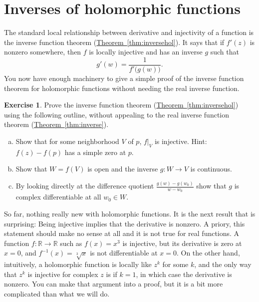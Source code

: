 \documentclass[12pt,openany]{book}
\newcommand{\R}{{\mathbb{R}}}
\theoremstyle{plain}
\theoremstyle{remark}
\theoremstyle{definition}
\newenvironment{exbox}{%
    \def\FrameCommand{\vrule width 1pt \relax\hspace{10pt}}%
    \MakeFramed{\advance\hsize-\width\FrameRestore}%
}{%
    \endMakeFramed
}
\newenvironment{exparts}{%
    \leavevmode\begin{enumerate}[a),noitemsep,topsep=0pt,parsep=0pt,partopsep=0pt]
}{%
    \end{enumerate}
}
\theoremstyle{exercise}
\newtheorem{exercise}{Exercise}[section]
\theoremstyle{example}
\newcommand{\thmref}[1]{\hyperref[#1]{Theorem~\ref*{#1}}}
\begin{document}
\section{Inverses of holomorphic functions} \label{sec:inverses}

The standard local relationship between derivative and injectivity of a
function is the inverse function theorem (\thmref{thm:inversehol}).
It says that if $f'(z)$ is nonzero somewhere, then $f$ is locally
injective and has an inverse $g$ such that
\begin{equation*}
g'(w) = \frac{1}{f'\bigl(g(w)\bigr)} .
\end{equation*}
You now have enough machinery to give a simple proof
of the inverse function theorem for holomorphic functions
without needing the real inverse function.

\begin{exbox}
\begin{exercise}
Prove the inverse function theorem (\thmref{thm:inversehol})
using the following outline, without appealing to the real inverse function
theorem (\thmref{thm:inverse}).
\begin{exparts}
\item Show that for some neighborhood $V$ of $p$, $f|_V$ is injective.
Hint: $f(z)-f(p)$ has a simple zero at $p$.
\item Show that $W = f(V)$ is open and the inverse $g \colon W \to V$ is
continuous.
\item By looking directly at the difference quotient $\frac{g(w)-g(w_0)}{w-w_0}$
show that $g$ is complex differentiable at all $w_0 \in W$.
\end{exparts}
\end{exercise}
\end{exbox}

So far, nothing really new with holomorphic functions.
It is the next
result that is surprising: Being injective
implies that the derivative is nonzero.
A priory, this statement should make no sense at all and it is not true for real functions.
A function $f \colon \R \to \R$ such as $f(x) = x^3$
is injective, but its derivative is zero at $x=0$, and $f^{-1}(x) =
\sqrt[3]{x}$ is not differentiable at $x=0$.
On the other hand, intuitively, a holomorphic function is
locally like $z^k$ for some $k$, and the only way that $z^k$ is injective
for complex $z$ is
if $k=1$, in which case the derivative is nonzero.
You can make that
argument into a proof, but it is a bit more complicated than what we will do.
\end{document}
